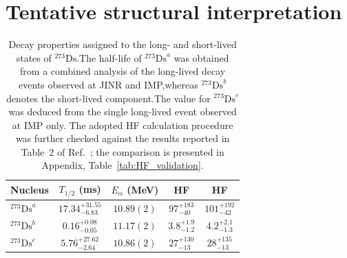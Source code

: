 \documentclass[11pt]{article}
\begin{document}
\FloatBarrier
\section*{Tentative structural interpretation}

\begin{table}[htbp]
\centering
\caption{Decay properties assigned to the long- and short-lived states of $^{273}\mathrm{Ds}$.The half-life of $^{273}\mathrm{Ds}^{a}$ was obtained from a combined analysis of the long-lived decay events observed at JINR and IMP,whereas $^{273}\mathrm{Ds}^{b}$ denotes the short-lived component.The value for $^{273}\mathrm{Ds}^{c}$ was deduced from the single long-lived event observed at IMP only.
The adopted HF calculation procedure was further checked against the
results reported in Table~2 of Ref.~\cite{hessbergerLowLyingIsomers2025};
the comparison is presented in Appendix, Table~\ref{tab:HF_validation}.}
\label{tab:decay_properties}
\begingroup
\renewcommand{\arraystretch}{1.22}
\setlength{\tabcolsep}{7pt}
\begin{tabular*}{0.92\textwidth}{@{\extracolsep{\fill}}lcccc@{}}
\toprule
Nucleus
& \shortstack{$T_{1/2}$\\(\si{\milli\second})}
& \shortstack{$E_{\alpha}$\\(\si{\mega\electronvolt})}
& \shortstack{HF\\ \cite{HFPoenaru,HFE}}
& \shortstack{HF\\ \cite{HFVs}}
\\
\midrule

$^{273}\mathrm{Ds}^{a}$
& $17.34^{+31.55}_{-6.83}$
& $10.89(2)$
& $97^{+183}_{-40}$
& $101^{+192}_{-42}$
\\
\addlinespace[0.25em]

$^{273}\mathrm{Ds}^{b}$
& $0.16^{+0.08}_{-0.05}$
& $11.17(2)$
& $3.8^{+1.9}_{-1.2}$
& $4.2^{+2.1}_{-1.3}$
\\
\addlinespace[0.25em]

$^{273}\mathrm{Ds}^{c}$
& $5.76^{+27.62}_{-2.64}$
& $10.86(2)$
& $27^{+130}_{-13}$
& $28^{+135}_{-13}$
\\



\bottomrule
\end{tabular*}
\endgroup
\end{table}
\end{document}
